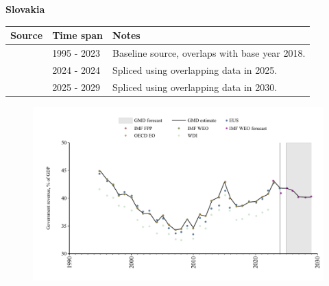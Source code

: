 \documentclass[12pt,a4paper,landscape]{article}
\begin{document}
\begin{adjustbox}{max totalsize={\paperwidth}{\paperheight},center}
\begin{minipage}[t][\textheight][t]{\textwidth}
\vspace*{0.5cm}
{}
\begin{center}
{\Large\bfseries Slovakia}
\end{center}
\vspace{0.5cm}
\begin{table}[H]
\centering
\small
\begin{tabular}{|l|l|l|}
\hline
\textbf{Source} & \textbf{Time span} & \textbf{Notes} \\
\hline
\rowcolor{white}\cite{OECD_EO}& 1995 - 2023 &Baseline source, overlaps with base year 2018.\\
\rowcolor{lightgray}\cite{EUS}& 2024 - 2024 &Spliced using overlapping data in 2025.\\
\rowcolor{white}\cite{IMF_WEO_forecast}& 2025 - 2029 &Spliced using overlapping data in 2030.\\
\hline
\end{tabular}
\end{table}
\begin{figure}[H]
\centering
\includegraphics[width=\textwidth,height=0.6\textheight,keepaspectratio]{graphs/SVK_govrev_GDP.pdf}
\end{figure}
\end{minipage}
\end{adjustbox}
\end{document}
